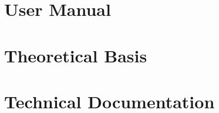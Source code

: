 \documentclass[12pt, letterpaper, fleqn]{report}
\begin{document}


\listoffigures

\tableofcontents

\part{User Manual}


\part{Theoretical Basis}


\part{Technical Documentation}

\appendix



\end{document}
